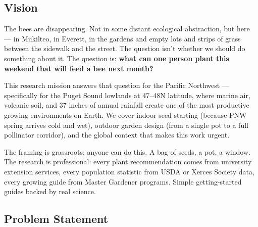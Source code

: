 \documentclass[11pt,letterpaper]{article}
\begin{document}
\subsection{Vision}

The bees are disappearing. Not in some distant ecological abstraction, but here --- in Mukilteo, in Everett, in the gardens and empty lots and strips of grass between the sidewalk and the street. The question isn't whether we should do something about it. The question is: \textbf{what can one person plant this weekend that will feed a bee next month?}

This research mission answers that question for the Pacific Northwest --- specifically for the Puget Sound lowlands at 47--48\textdegree N latitude, where marine air, volcanic soil, and 37 inches of annual rainfall create one of the most productive growing environments on Earth. We cover indoor seed starting (because PNW spring arrives cold and wet), outdoor garden design (from a single pot to a full pollinator corridor), and the global context that makes this work urgent.

The framing is grassroots: anyone can do this. A bag of seeds, a pot, a window. The research is professional: every plant recommendation comes from university extension services, every population statistic from USDA or Xerces Society data, every growing guide from Master Gardener programs. Simple getting-started guides backed by real science.

\subsection{Problem Statement}
\end{document}
